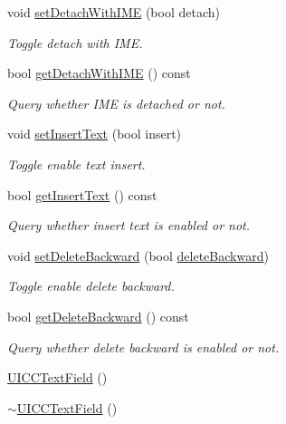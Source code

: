 \begin{DoxyCompactItemize}
void \hyperlink{classui_1_1UICCTextField_a93a1fd10bfd3f6547045320b605f8987}{set\+Detach\+With\+I\+ME} (bool detach)
\begin{DoxyCompactList}\small\item\em Toggle detach with I\+ME. \end{DoxyCompactList}\item 
bool \hyperlink{classui_1_1UICCTextField_a834dc8e546abd0b02437018e97bbce71}{get\+Detach\+With\+I\+ME} () const
\begin{DoxyCompactList}\small\item\em Query whether I\+ME is detached or not. \end{DoxyCompactList}\item 
void \hyperlink{classui_1_1UICCTextField_a27a756bfbc4d7adbdb0015756ef399ef}{set\+Insert\+Text} (bool insert)
\begin{DoxyCompactList}\small\item\em Toggle enable text insert. \end{DoxyCompactList}\item 
bool \hyperlink{classui_1_1UICCTextField_a789a293f8c433f6f434e57f8438193ab}{get\+Insert\+Text} () const
\begin{DoxyCompactList}\small\item\em Query whether insert text is enabled or not. \end{DoxyCompactList}\item 
void \hyperlink{classui_1_1UICCTextField_a023e1be2c42fac0ee7a1997885b5763d}{set\+Delete\+Backward} (bool \hyperlink{classui_1_1UICCTextField_ac7b7cc8ebdb6ffa1f9c480a8e9173a4c}{delete\+Backward})
\begin{DoxyCompactList}\small\item\em Toggle enable delete backward. \end{DoxyCompactList}\item 
bool \hyperlink{classui_1_1UICCTextField_a1fa647f6e2272f11dfb6d1a5bb1e2b7c}{get\+Delete\+Backward} () const
\begin{DoxyCompactList}\small\item\em Query whether delete backward is enabled or not. \end{DoxyCompactList}\item 
\hyperlink{classui_1_1UICCTextField_a0066110e47fa1a5e5f518bfde6d0ade7}{U\+I\+C\+C\+Text\+Field} ()
\item 
\hyperlink{classui_1_1UICCTextField_a31fb9b3cad0ea7dbb25ddf1599cbd811}{$\sim$\+U\+I\+C\+C\+Text\+Field} ()
\item 

\end{DoxyCompactItemize}
